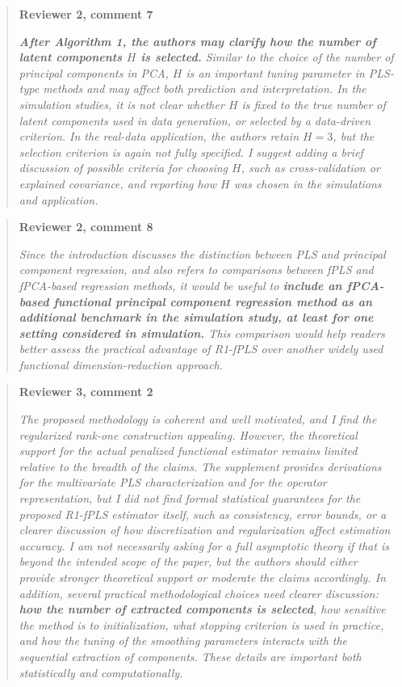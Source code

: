 \documentclass[11pt,a4paper]{article}
\newcommand{\reviewcomment}[2]{%
  \begin{quote}\small
  \textbf{#1}\par
  \emph{#2}
  \end{quote}
}
\newcommand{\reviewhighlight}[1]{\textcolor{blue!70!black}{\textbf{#1}}}
\begin{document}
\reviewcomment{Reviewer 2, comment 7}{
\reviewhighlight{After Algorithm 1, the authors may clarify how the number of latent
components $H$ is selected.} Similar to the choice of the number of principal components in
PCA, $H$ is an important tuning parameter in PLS-type methods and may affect both prediction
and interpretation. In the simulation studies, it is not clear whether $H$ is fixed to the
true number of latent components used in data generation, or selected by a data-driven
criterion. In the real-data application, the authors retain $H=3$, but the selection criterion
is again not fully specified. I suggest adding a brief discussion of possible criteria for
choosing $H$, such as cross-validation or explained covariance, and reporting how $H$ was
chosen in the simulations and application.}

\reviewcomment{Reviewer 2, comment 8}{
Since the introduction discusses the distinction between PLS and principal component regression,
and also refers to comparisons between fPLS and fPCA-based regression methods, it would be
useful to \reviewhighlight{include an fPCA-based functional principal component regression
method as an additional benchmark in the simulation study, at least for one setting considered
in simulation.} This comparison would help readers better assess the practical advantage of
R1-fPLS over another widely used functional dimension-reduction approach.}

\reviewcomment{Reviewer 3, comment 2}{
The proposed methodology is coherent and well motivated, and I find the regularized rank-one
construction appealing. However, the theoretical support for the actual penalized functional
estimator remains limited relative to the breadth of the claims. The supplement provides derivations
for the multivariate PLS characterization and for the operator representation, but I did not find
formal statistical guarantees for the proposed R1-fPLS estimator itself, such as consistency, error
bounds, or a clearer discussion of how discretization and regularization affect estimation accuracy.
I am not necessarily asking for a full asymptotic theory if that is beyond the intended scope of the
paper, but the authors should either provide stronger theoretical support or moderate the claims
accordingly.
In addition, several practical methodological choices need clearer discussion:
\reviewhighlight{how the number of extracted components is selected}, how sensitive the method
is to initialization, what stopping criterion is used in practice, and how the tuning of the
smoothing parameters interacts with the sequential extraction of components. These details are
important both statistically and computationally.}
\end{document}
